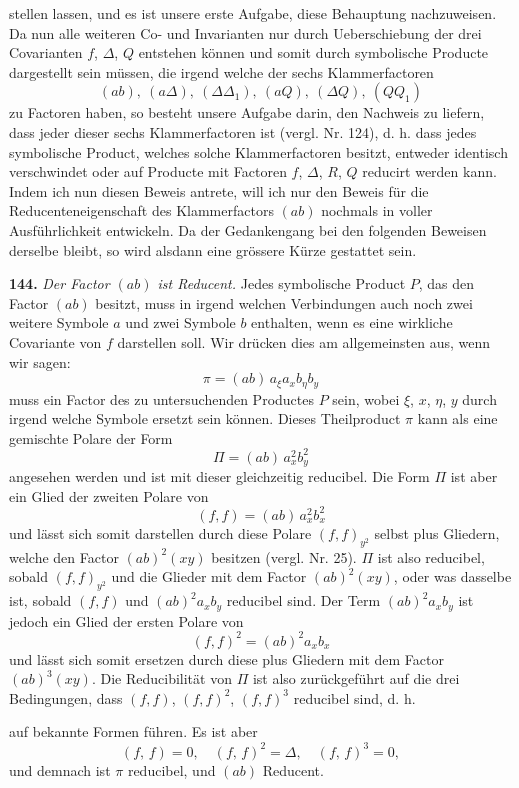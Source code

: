 \documentclass[11pt]{article}
\providecommand{\gesperrt}[1]{\textls[130]{#1}}
\providecommand{\weberpage}[1]{}
\let\Delta\varDelta
\let\Pi\varPi
\begin{document}
\weberpage{168}
stellen lassen, und es ist unsere erste Aufgabe, diese Behauptung nachzuweisen. Da nun alle weiteren Co- und Invarianten nur durch Ueberschiebung der drei Covarianten $f$, $\Delta$, $Q$ entstehen können und somit durch symbolische Producte dargestellt sein müssen, die irgend welche der sechs Klammerfactoren
\[
(ab),\ (a\Delta),\ (\Delta\Delta_1),\ (aQ),\ (\Delta Q),\ (QQ_1)
\]
zu Factoren haben, so besteht unsere Aufgabe darin, den Nachweis zu liefern, dass jeder dieser sechs Klammerfactoren \gesperrt{Reducent} ist (vergl. Nr. 124), d. h. dass jedes symbolische Product, welches solche Klammerfactoren besitzt, entweder identisch verschwindet oder auf Producte mit Factoren $f$, $\Delta$, $R$, $Q$ reducirt werden kann. Indem ich nun diesen Beweis antrete, will ich nur den Beweis für die Reducenteneigenschaft des Klammerfactors $(ab)$ nochmals in voller Ausführlichkeit entwickeln. Da der Gedankengang bei den folgenden Beweisen derselbe bleibt, so wird alsdann eine grössere Kürze gestattet sein.

\textbf{144.} \textit{Der Factor $(ab)$ ist Reducent.} Jedes symbolische Product $P$, das den Factor $(ab)$ besitzt, muss in irgend welchen Verbindungen auch noch zwei weitere Symbole $a$ und zwei Symbole $b$ enthalten, wenn es eine wirkliche Covariante von $f$ darstellen soll. Wir drücken dies am allgemeinsten aus, wenn wir sagen:
\[
\pi = (ab)\,a_\xi a_x b_\eta b_y
\]
muss ein Factor des zu untersuchenden Productes $P$ sein, wobei $\xi$, $x$, $\eta$, $y$ durch irgend welche Symbole ersetzt sein können. Dieses Theilproduct $\pi$ kann als eine gemischte Polare der Form
\[
\Pi = (ab)\,a_x^2 b_y^2
\]
angesehen werden und ist mit dieser gleichzeitig reducibel. Die Form $\Pi$ ist aber ein Glied der zweiten Polare von
\[
(f,f) = (ab)\,a_x^2 b_x^2
\]
und lässt sich somit darstellen durch diese Polare $(f,f)_{y^2}$ selbst plus Gliedern, welche den Factor $(ab)^2(xy)$ besitzen (vergl. Nr. 25). $\Pi$ ist also reducibel, sobald $(f,f)_{y^2}$ und \gesperrt{auch} die Glieder mit dem Factor $(ab)^2(xy)$, oder was dasselbe ist, sobald $(f,f)$ und $(ab)^2a_xb_y$ reducibel sind. Der Term $(ab)^2a_xb_y$ ist jedoch ein Glied der ersten Polare von
\[
(f,f)^2 = (ab)^2a_xb_x
\]
und lässt sich somit ersetzen durch diese plus Gliedern mit dem Factor $(ab)^3(xy)$. Die Reducibilität von $\Pi$ ist also zurückgeführt auf die drei Bedingungen, dass $(f,f)$, $(f,f)^2$, $(f,f)^3$ reducibel sind, d. h.


\weberpage{169}
auf bekannte Formen führen. Es ist aber
\[
(f,\,f) = 0, \quad (f,\,f)^2 = \Delta, \quad (f,\,f)^3 = 0,
\]
und demnach ist $\pi$ reducibel, und $(ab)$ Reducent.
\end{document}
